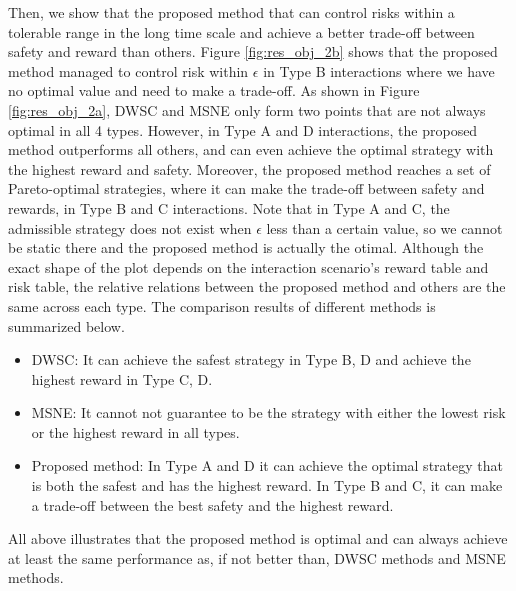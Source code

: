 \documentclass[letterpaper]{article} %
\begin{document}
Then, we show that the proposed method that can control risks within a tolerable range in the long time scale and achieve a better trade-off between safety and reward than others. 
Figure \ref{fig:res_obj_2b} shows that the proposed method managed to control risk within $\epsilon$ in Type B interactions where we have no optimal value and need to make a trade-off.
As shown in Figure \ref{fig:res_obj_2a}, DWSC and MSNE only form two points that are not always optimal in all 4 types. However, in Type A and D interactions, the proposed method outperforms all others, and can even achieve the optimal strategy with the highest reward and safety. Moreover, the proposed method reaches a set of Pareto-optimal strategies, where it can make the trade-off between safety and rewards, in Type B and C interactions. Note that in Type A and C, the admissible strategy does not exist when $\epsilon$ less than a certain value, so we cannot be static there and the proposed method is actually the otimal. Although the exact shape of the plot depends on the interaction scenario's reward table and risk table, the relative relations between the proposed method and others are the same across each type.
The comparison results of different methods is summarized below.
\begin{itemize}
    \item DWSC: It can achieve the safest strategy in Type B, D and achieve the highest reward in Type C, D.
    \item MSNE: It cannot not guarantee to be the strategy with either the lowest risk or the highest reward in all types.
    \item Proposed method: In Type A and D it can achieve the optimal strategy that is both the safest and has the highest reward. In Type B and C, it can make a trade-off between the best safety and the highest reward.
\end{itemize}
All above illustrates that the proposed method is optimal and can always achieve at least the same performance as, if not better than, DWSC methods and MSNE methods. 
\end{document}
